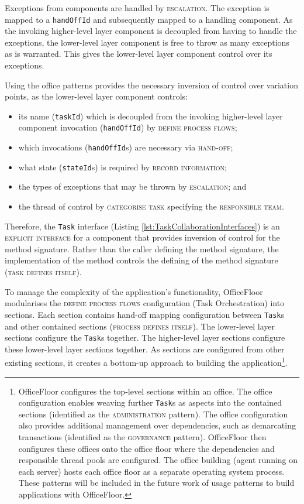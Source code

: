 \documentclass[prodmode]{style/acmlarge}
\begin{document}
Exceptions from components are handled by \textsc{escalation}.  The exception is
mapped to a \texttt{handOffId} and subsequently mapped to a handling component. 
As the invoking higher-level layer component is decoupled from having to handle
the exceptions, the lower-level layer component is free to throw as many
exceptions as is warranted.  This gives the lower-level layer component control
over its exceptions.

Using the office patterns provides the necessary inversion of control over
variation points, as the lower-level layer component controls:
\begin{itemize}
  \item its name (\texttt{taskId}) which is decoupled from the invoking higher-level layer component invocation (\texttt{handOffId}) by \textsc{define process flows};
  \item which invocations (\texttt{handOffId}s) are necessary via \textsc{hand-off};
  \item what state (\texttt{stateId}s) is required by \textsc{record information};
  \item the types of exceptions that may be thrown by \textsc{escalation}; and
  \item the thread of control by \textsc{categorise task} specifying the \textsc{responsible team}.
\end{itemize}

Therefore, the \texttt{Task} interface (Listing
\ref{lst:TaskCollaborationInterfaces}) is an \textsc{explicit interface} for a
component that provides inversion of control for the method signature.
Rather than the caller defining the method signature, the implementation of the
method controls the defining of the method signature (\textsc{task defines
itself}).

To manage the complexity of the application's functionality, OfficeFloor
modularises the \textsc{define process flows} configuration (Task Orchestration)
into sections.  Each section contains hand-off mapping configuration between
\texttt{Task}s and other contained sections (\textsc{process defines itself}).
The lower-level layer sections configure the \texttt{Task}s together.  The
higher-level layer sections configure these lower-level layer sections together.
As sections are configured from other existing sections, it creates a bottom-up
approach to building the application\footnote{OfficeFloor configures the
top-level sections within an office.  The office configuration enables weaving
further \texttt{Task}s as aspects into the contained sections (identified as the
\textsc{administration} pattern).  The office configuration also provides
additional management over dependencies, such as demarcating transactions
(identified as the \textsc{governance} pattern). OfficeFloor then configures
these offices onto the office floor where the dependencies and responsible
thread pools are configured.  The office building (agent running on each server)
hosts each office floor as a separate operating system process.  These patterns
will be included in the future work of usage patterns to build applications with
OfficeFloor.}.
\end{document}
